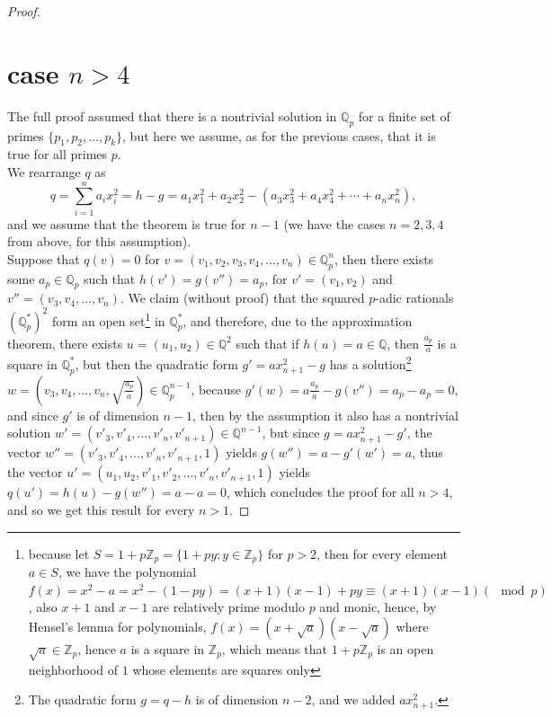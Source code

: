 \documentclass{article}
\begin{document}
\begin{proof}
\section*{case $n>4$}
The full proof assumed that there is a nontrivial solution in $\mathbb{Q}_p$ for a finite set of primes $\{p_1,p_2,\dots,p_k\}$, but here we assume, as for the previous cases, that it is true for all primes $p$.\\
We rearrange $q$ as 
\[q=\sum_{i=1}^na_ix_i^2=h-g=a_1x_1^2+a_2x_2^2-(a_3x_3^2+a_4x_4^2+\cdots+a_nx_n^2),\] 
and we assume that the theorem is true for $n-1$ (we have the cases $n=2,3,4$ from above, for this assumption).\\
Suppose that $q(v)=0$ for $v=(v_1,v_2,v_3,v_4,\dots,v_n)\in\mathbb{Q}_p^n$, then there exists some $a_p\in\mathbb{Q}_p$ such that $h(v')=g(v'')=a_p$, for $v'=(v_1,v_2)$ and $v''=(v_3,v_4,\dots,v_n)$.
We claim (without proof) that the squared $p$-adic rationals $(\mathbb{Q}_p^{\ast})^2$ form an open set\footnote{because let $S=1+p\mathbb{Z}_p=\{1+py : y\in\mathbb{Z}_p\}$ for $p>2$, then for every element $a\in{S}$, we have the polynomial $f(x)=x^2-a=x^2-(1-py)=(x+1)(x-1)+py\equiv(x+1)(x-1)(\mod{p})$, also $x+1$ and $x-1$ are relatively prime modulo $p$ and monic, hence, by Hensel’s lemma for polynomials, $f(x)=(x+\sqrt{a})(x-\sqrt{a})$ where $\sqrt{a}\in\mathbb{Z}_p$, hence $a$ is a square in $\mathbb{Z}_p$, which means that $1+p\mathbb{Z}_p$ is an open neighborhood of $1$ whose elements are squares only} in $\mathbb{Q}_p^{\ast}$, and therefore, due to the approximation theorem, there exists $u=(u_1,u_2)\in\mathbb{Q}^2$ such that if $h(u)=a\in\mathbb{Q}$, then $\frac{a_p}{a}$ is a square in $\mathbb{Q}_p^{\ast}$, but then the quadratic form $g'=ax_{n+1}^2-g$ has a solution\footnote{The quadratic form $g=q-h$ is of dimension $n-2$, and we added $ax_{n+1}^2$.}  $w=(v_3,v_4,\dots,v_n,\sqrt{\frac{a_p}{a}})\in\mathbb{Q}_p^{n-1}$, because $g'(w)=a\frac{a_p}{a}-g(v'')=a_p-a_p=0$, and since $g'$ is of dimension $n-1$, then by the assumption it also has a nontrivial solution $w'=(v'_3,v'_4,\dots,v'_n,v'_{n+1})\in\mathbb{Q}^{n-1}$, but since $g=ax_{n+1}^2-g'$, the vector $w''=(v'_3,v'_4,\dots,v'_n,v'_{n+1},1)$ yields $g(w'')=a-g'(w')=a$, thus the vector $u'=(u_1,u_2,v'_1,v'_2,\dots,v'_n,v'_{n+1},1)$ yields $q(u')=h(u)-g(w'')=a-a=0$, which concludes  the proof for all $n>4$, and so we get this result for every $n>1$.
\end{proof}
\end{document}
